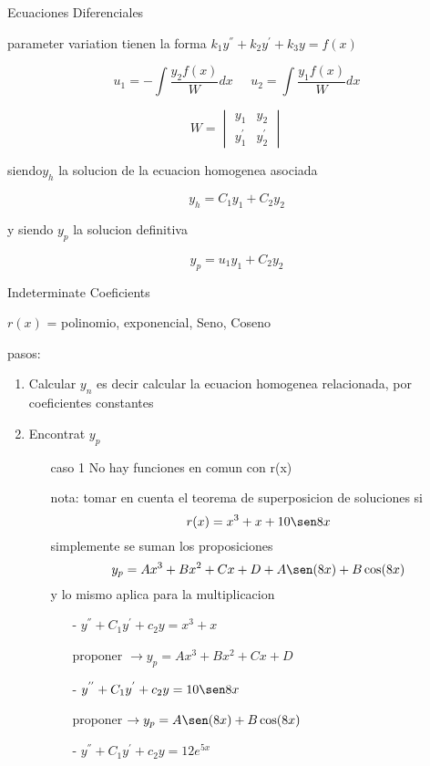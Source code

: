 \begin{section}{Ecuaciones Diferenciales}
\begin{subsection}{parameter variation}
		tienen la forma $k_1y^{''} + k_2y^{'} + k_3y = f(x) $
		
		$$u_1 = - \int \frac{y_2f(x)}{W} dx \;\; \;\;\; u_2 =  \int \frac{y_1f(x)}{W} dx $$
		
		$$
		W=
		\begin{vmatrix}
		y_1 & y_2 \\
			y_1^{'} & y_2^{'}
		\end{vmatrix}
		$$
		\begin{center}
			siendo$y_h$ la solucion de la ecuacion homogenea asociada
		
			$$ y_h = C_1y_1 + C_2y_2 $$
		
			y siendo $y_p$ la solucion definitiva
		
			$$ y_p = u_1y_1 + C_2y_2 $$
		
		\end{center}
	
	\end{subsection}
	\begin{subsection}{Indeterminate Coeficients}
		\begin{center}
			$r(x)$ = polinomio, exponencial, Seno, Coseno 
		\end{center}
		
		pasos:
		\begin{enumerate}
			\item Calcular $y_n$ es decir
				calcular la ecuacion homogenea relacionada, por coeficientes constantes
				
			\item Encontrat $y_p$
				\begin{enumerate}
					\item[caso 1] No hay funciones en comun con r(x)
		
						nota: tomar en cuenta el teorema de superposicion de soluciones
						si $$r(x) = x^3 + x +  10 \sen 8x$$
						simplemente se suman los proposiciones
						 $$y_p = Ax^3 + Bx^2 + Cx + D +  A \sen (8x) + B \cos (8x) $$
						 y lo mismo aplica para la multiplicacion
		
						\begin{enumerate}
							\item[-] $y^{''} + C_1y^{'} + c_2y = x^3 + x$
		
								proponer $\rightarrow y_p = Ax^3 + Bx^2 + Cx + D$
							\item[-] $y^{''} + C_1y^{'} + c_2y = 10 \sen 8x$
		
								proponer $\rightarrow y_p = A \sen (8x) + B \cos (8x) $
							\item[-] $y^{''} + C_1y^{'} + c_2y = 12 e^{5x} $
		

\end{enumerate}
\end{enumerate}
\end{enumerate}
\end{subsection}
\end{section}
